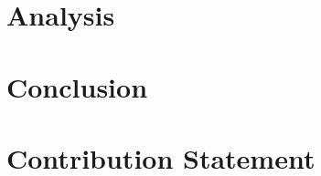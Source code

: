 \documentclass{article}
\begin{document}
\section{Analysis}


\section{Conclusion}


\section*{Contribution Statement}






\end{document}
